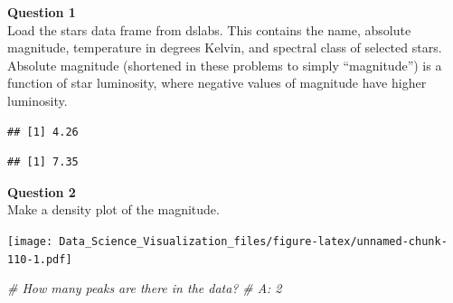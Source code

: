 \documentclass[
]{article}
\newenvironment{Shaded}{\begin{snugshade}}{\end{snugshade}}
\newcommand{\CommentTok}[1]{\textcolor[rgb]{0.56,0.35,0.01}{\textit{#1}}}
\newcommand{\KeywordTok}[1]{\textcolor[rgb]{0.13,0.29,0.53}{\textbf{#1}}}
\newcommand{\NormalTok}[1]{#1}
\newcommand{\OperatorTok}[1]{\textcolor[rgb]{0.81,0.36,0.00}{\textbf{#1}}}
\newcommand{\StringTok}[1]{\textcolor[rgb]{0.31,0.60,0.02}{#1}}
\begin{document}
\textbf{Question 1}\\
Load the stars data frame from dslabs. This contains the name, absolute
magnitude, temperature in degrees Kelvin, and spectral class of selected
stars. Absolute magnitude (shortened in these problems to simply
``magnitude'') is a function of star luminosity, where negative values
of magnitude have higher luminosity.

\begin{Shaded}
\end{Shaded}

\begin{verbatim}
## [1] 4.26
\end{verbatim}

\begin{Shaded}
\end{Shaded}

\begin{verbatim}
## [1] 7.35
\end{verbatim}

\textbf{Question 2}\\
Make a density plot of the magnitude.

\begin{Shaded}
\end{Shaded}

\texttt{[image: Data\_Science\_Visualization\_files/figure-latex/unnamed-chunk-110-1.pdf]}

\begin{Shaded}
\begin{Highlighting}[]
\CommentTok{# How many peaks are there in the data?}
\CommentTok{# A: 2}
\end{Highlighting}
\end{Shaded}
\end{document}
